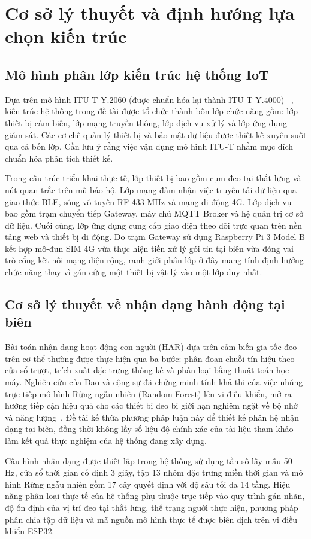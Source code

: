 \section{Cơ sở lý thuyết và định hướng lựa chọn kiến trúc}
\subsection{Mô hình phân lớp kiến trúc hệ thống IoT}
Dựa trên mô hình ITU-T Y.2060 (được chuẩn hóa lại thành ITU-T Y.4000) ~\cite{itu}, kiến trúc hệ thống trong đề tài được tổ chức thành bốn lớp chức năng gồm: lớp thiết bị cảm biến, lớp mạng truyền thông, lớp dịch vụ xử lý và lớp ứng dụng giám sát. Các cơ chế quản lý thiết bị và bảo mật dữ liệu được thiết kế xuyên suốt qua cả bốn lớp. Cần lưu ý rằng việc vận dụng mô hình ITU-T nhằm mục đích chuẩn hóa phân tích thiết kế.

Trong cấu trúc triển khai thực tế, lớp thiết bị bao gồm cụm đeo tại thắt lưng và nút quan trắc trên mũ bảo hộ. Lớp mạng đảm nhận việc truyền tải dữ liệu qua giao thức BLE, sóng vô tuyến RF 433 MHz và mạng di động 4G. Lớp dịch vụ bao gồm trạm chuyển tiếp Gateway, máy chủ MQTT Broker và hệ quản trị cơ sở dữ liệu. Cuối cùng, lớp ứng dụng cung cấp giao diện theo dõi trực quan trên nền tảng web và thiết bị di động. Do trạm Gateway sử dụng Raspberry Pi 3 Model B kết hợp mô-đun SIM 4G vừa thực hiện tiền xử lý gói tin tại biên vừa đóng vai trò cổng kết nối mạng diện rộng, ranh giới phân lớp ở đây mang tính định hướng chức năng thay vì gán cứng một thiết bị vật lý vào một lớp duy nhất.

\subsection{Cơ sở lý thuyết về nhận dạng hành động tại biên}
Bài toán nhận dạng hoạt động con người (HAR) dựa trên cảm biến gia tốc đeo trên cơ thể thường được thực hiện qua ba bước: phân đoạn chuỗi tín hiệu theo cửa sổ trượt, trích xuất đặc trưng thống kê và phân loại bằng thuật toán học máy. Nghiên cứu của Dao và cộng sự đã chứng minh tính khả thi của việc nhúng trực tiếp mô hình Rừng ngẫu nhiên (Random Forest) lên vi điều khiển, mở ra hướng tiếp cận hiệu quả cho các thiết bị đeo bị giới hạn nghiêm ngặt về bộ nhớ và năng lượng~\cite{har}. Đề tài kế thừa phương pháp luận này để thiết kế phân hệ nhận dạng tại biên, đồng thời không lấy số liệu độ chính xác của tài liệu tham khảo làm kết quả thực nghiệm của hệ thống đang xây dựng.

Cấu hình nhận dạng được thiết lập trong hệ thống sử dụng tần số lấy mẫu 50 Hz, cửa sổ thời gian cố định 3 giây, tập 13 nhóm đặc trưng miền thời gian và mô hình Rừng ngẫu nhiên gồm 17 cây quyết định với độ sâu tối đa 14 tầng. Hiệu năng phân loại thực tế của hệ thống phụ thuộc trực tiếp vào quy trình gán nhãn, độ ổn định của vị trí đeo tại thắt lưng, thể trạng người thực hiện, phương pháp phân chia tập dữ liệu và mã nguồn mô hình thực tế được biên dịch trên vi điều khiển ESP32.

